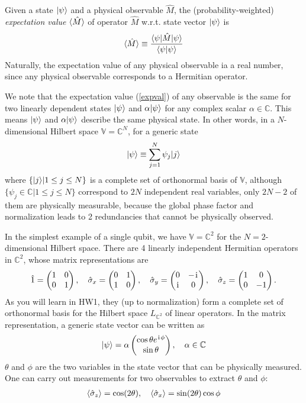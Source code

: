 Given a state $|{\psi}\rangle$ and a physical observable $\hat M$, the (probability-weighted) \emph{expectation value} $\langle{\hat M}\rangle$ of operator $\hat M$ w.r.t. state vector $|{\psi}\rangle$ is
\begin{align}
\label{expval}
\langle{\hat M}\rangle\equiv\frac{\langle{\psi|\hat M|\psi}\rangle}{\langle{\psi|\psi}\rangle}
\end{align}
Naturally, the expectation value of any physical observable ia a real number, since any physical observable corresponds to a Hermitian operator.

We note that the expectation value (\ref{expval}) of any observable is the same for two linearly dependent states $|{\psi}\rangle$ and $\alpha|{\psi}\rangle$ for any complex scalar $\alpha\in\mathbb{C}$. This means $|{\psi}\rangle$ and $\alpha|{\psi}\rangle$ describe the same physical state. In other words, in a $N$-dimensional Hilbert space $\mathbb{V}=\mathbb{C}^N$, for a generic state
\begin{align}
|{\psi}\rangle\equiv\sum_{j=1}^N\psi_j|{j}\rangle
\end{align}
where $\{|{j}\rangle|1\leq j\leq N\}$ is a complete set of orthonormal basis of $\mathbb{V}$, although $\{\psi_j\in\mathbb{C}|1\leq j\leq N\}$ correspond to $2N$ independent real variables, only $2N-2$ of them are physically measurable, because the global phase factor and normalization leads to 2 redundancies that cannot be physically observed.

In the simplest example of a single qubit, we have $\mathbb{V}=\mathbb{C}^2$ for the $N=2$-dimensional Hilbert space. There are 4 linearly independent Hermitian operators in $\mathbb{C}^2$, whose matrix representations are
\begin{align}
\hat 1=\begin{pmatrix}1&0\\0&1\end{pmatrix},~~~\hat\sigma_x=\begin{pmatrix}0&1\\1&0\end{pmatrix},~~~\hat\sigma_y=\begin{pmatrix}0&-\hspace{1pt}\mathrm{i}\hspace{1pt}\\ \hspace{1pt}\mathrm{i}\hspace{1pt}&0\end{pmatrix},~~~\hat\sigma_z=\begin{pmatrix}1&0\\0&-1\end{pmatrix}.
\end{align}
As you will learn in HW1, they (up to normalization) form a complete set of orthonormal basis for the Hilbert space $L_{\mathbb{C}^2}$ of linear operators. In the matrix representation, a generic state vector can be written as
\begin{align}
|{\psi}\rangle=\alpha\begin{pmatrix}\cos\theta e^{\hspace{1pt}\mathrm{i}\hspace{1pt}\phi}\\ \sin\theta\end{pmatrix},~~~\alpha\in\mathbb{C}
\end{align}
$\theta$ and $\phi$ are the two variables in the state vector that can be physically measured. One can carry out measurements for two observables to extract $\theta$ and $\phi$:
\begin{align}
\langle{\hat\sigma_z}\rangle=\cos(2\theta),~~~\langle{\hat\sigma_x}\rangle=\sin(2\theta)\cos\phi
\end{align}

